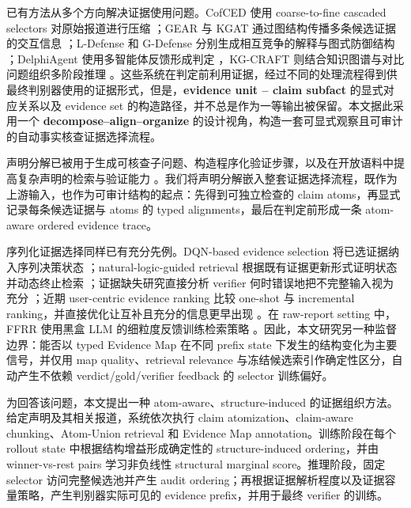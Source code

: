 \documentclass[letterpaper]{article}
\begin{document}
已有方法从多个方向解决证据使用问题。CofCED 使用 coarse-to-fine cascaded selectors 对原始报道进行压缩 \citep{Yang2022CofCED}；GEAR 与 KGAT 通过图结构传播多条候选证据的交互信息 \citep{Zhou2019GEAR,Liu2019KGAT}；L-Defense 和 G-Defense 分别生成相互竞争的解释与图式防御结构 \citep{Wang2024LDefense,Wang2026GDefense}；DelphiAgent 使用多智能体反馈形成判定 \citep{Xiong2025DelphiAgent}，KG-CRAFT 则结合知识图谱与对比问题组织多阶段推理 \citep{Lourenco2026KGCRAFT}。这些系统在判定前利用证据，经过不同的处理流程得到供最终判别器使用的证据形式，但是，\textbf{evidence unit -- claim subfact} 的显式对应关系以及 evidence set 的构造路径，并不总是作为一等输出被保留。本文据此采用一个 \textbf{decompose--align--organize} 的设计视角，构造一套可显式观察且可审计的自动事实核查证据选择流程。

声明分解已被用于生成可核查子问题、构造程序化验证步骤，以及在开放语料中提高复杂声明的检索与验证能力 \citep{Chen2022ClaimDecomp,Pan2023ProgramFC,Chen2023WildEvidence}。我们将声明分解嵌入整套证据选择流程，既作为上游输入，也作为可审计结构的起点：先得到可独立检查的 claim atoms，再显式记录每条候选证据与 atoms 的 typed alignments，最后在判定前形成一条 atom-aware ordered evidence trace。

序列化证据选择同样已有充分先例。DQN-based evidence selection 将已选证据纳入序列决策状态 \citep{Wan2021DQN}；natural-logic-guided retrieval 根据既有证据更新形式证明状态并动态终止检索 \citep{Aly2022NaturalLogic}；证据缺失研究直接分析 verifier 何时错误地把不完整输入视为充分 \citep{Atanasova2022Insufficient}；近期 user-centric evidence ranking 比较 one-shot 与 incremental ranking，并直接优化让互补且充分的信息更早出现 \citep{Alt2026EvidenceRanking}。在 raw-report setting 中，FFRR 使用黑盒 LLM 的细粒度反馈训练检索策略 \citep{Zhang2024FFRR}。因此，本文研究另一种监督边界：能否以 typed Evidence Map 在不同 prefix state 下发生的结构变化为主要信号，并仅用 map quality、retrieval relevance 与冻结候选索引作确定性区分，自动产生不依赖 verdict/gold/verifier feedback 的 selector 训练偏好。

为回答该问题，本文提出一种 atom-aware、structure-induced 的证据组织方法。给定声明及其相关报道，系统依次执行 claim atomization、claim-aware chunking、Atom-Union retrieval 和 Evidence Map annotation。训练阶段在每个 rollout state 中根据结构增益形成确定性的 structure-induced ordering，并由 winner-vs-rest pairs 学习非负线性 structural marginal score。推理阶段，固定 selector 访问完整候选池并产生 audit ordering；再根据证据解析程度以及证据容量策略，产生判别器实际可见的 evidence prefix，并用于最终 verifier 的训练。
\end{document}
